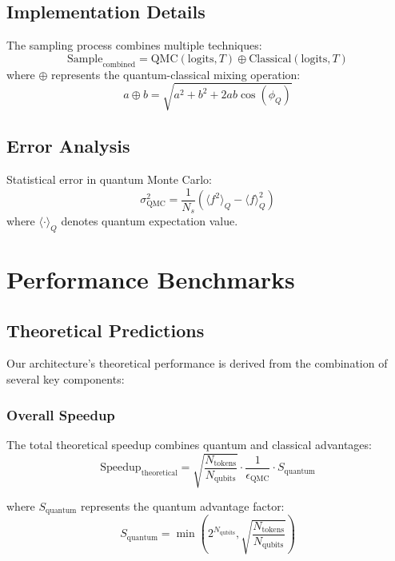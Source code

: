 \documentclass{article}
\begin{document}
\subsection{Implementation Details}
The sampling process combines multiple techniques:
\begin{equation}
\text{Sample}_{\text{combined}} = \text{QMC}(\text{logits}, T) \oplus \text{Classical}(\text{logits}, T)
\end{equation}
where $\oplus$ represents the quantum-classical mixing operation:
\begin{equation}
a \oplus b = \sqrt{a^2 + b^2 + 2ab\cos(\phi_Q)}
\end{equation}

\subsection{Error Analysis}
Statistical error in quantum Monte Carlo:
\begin{equation}
\sigma_{\text{QMC}}^2 = \frac{1}{N_s}\left(\langle f^2\rangle_Q - \langle f\rangle_Q^2\right)
\end{equation}
where $\langle \cdot \rangle_Q$ denotes quantum expectation value.

\section{Performance Benchmarks}

\subsection{Theoretical Predictions}
Our architecture's theoretical performance is derived from the combination of several key components:

\subsubsection{Overall Speedup}
The total theoretical speedup combines quantum and classical advantages:
\begin{equation}
\text{Speedup}_{\text{theoretical}} = \sqrt{\frac{N_{\text{tokens}}}{N_{\text{qubits}}}} \cdot \frac{1}{\epsilon_{\text{QMC}}} \cdot S_{\text{quantum}}
\end{equation}

where $S_{\text{quantum}}$ represents the quantum advantage factor:
\begin{equation}
S_{\text{quantum}} = \min\left(2^{N_{\text{qubits}}}, \sqrt{\frac{N_{\text{tokens}}}{N_{\text{qubits}}}}\right)
\end{equation}
\end{document}
